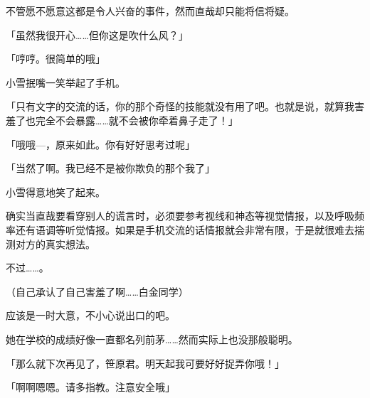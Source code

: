 不管愿不愿意这都是令人兴奋的事件，然而直哉却只能将信将疑。

「虽然我很开心……但你这是吹什么风？」

「哼哼。很简单的哦」

小雪抿嘴一笑举起了手机。

「只有文字的交流的话，你的那个奇怪的技能就没有用了吧。也就是说，就算我害羞了也完全不会暴露……就不会被你牵着鼻子走了！」

「哦哦—，原来如此。你有好好思考过呢」

「当然了啊。我已经不是被你欺负的那个我了」

小雪得意地笑了起来。

确实当直哉要看穿别人的谎言时，必须要参考视线和神态等视觉情报，以及呼吸频率还有语调等听觉情报。如果是手机交流的话情报就会非常有限，于是就很难去揣测对方的真实想法。

不过……。

（自己承认了自己害羞了啊……白金同学）

应该是一时大意，不小心说出口的吧。

她在学校的成绩好像一直都名列前茅……然而实际上也没那般聪明。

「那么就下次再见了，笹原君。明天起我可要好好捉弄你哦！」

「啊啊嗯嗯。请多指教。注意安全哦」

